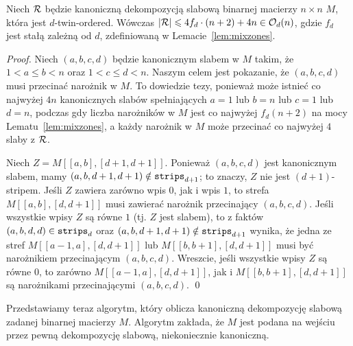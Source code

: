 \documentclass[runningheads]{llncs}
\newcommand{\Oh}{\mathcal{O}}
\renewcommand{\leq}{\leqslant}
\begin{document}
\begin{lemma}\label{lem:canonical-small}
	Niech $\cal R$ będzie kanoniczną dekompozycją slabową binarnej macierzy $n\times n$ $M$, która jest $d$-twin-ordered. Wówczas $|{\cal R}|\leq 4 f_d \cdot (n+2)+4n \in \Oh_d(n)$, gdzie $f_d$ jest 
	stałą zależną od $d$, zdefiniowaną w Lemacie~\ref{lem:mixzones}.
\end{lemma}
\begin{proof}
	Niech $(a,b,c,d)$ będzie kanonicznym slabem w $M$ takim, że $1<a\leq b< n$ oraz $1<c\leq d<n$.
	Naszym celem jest pokazanie, że $(a,b,c,d)$ musi przecinać narożnik w $M$. To dowiedzie tezy, ponieważ może istnieć co najwyżej $4n$ kanonicznych slabów spełniających $a=1$ lub $b=n$ lub $c=1$ lub $d=n$, podczas gdy liczba narożników w $M$ jest co najwyżej $f_d(n+2)$ na mocy Lematu~\ref{lem:mixzones}, a każdy narożnik w $M$ może przecinać co najwyżej $4$ slaby z $\cal R$.
	
	Niech $Z=M[[a,b],[d+1,d+1]]$.
	Ponieważ $(a,b,c,d)$ jest kanonicznym slabem, mamy $(a,b,d+1,d+1)\notin \mathtt{strips}_{d+1}$; to znaczy, $Z$ nie jest $(d+1)$-stripem. Jeśli $Z$ zawiera zarówno wpis $0$, jak i wpis $1$, to strefa $M[[a,b],[d,d+1]]$ musi zawierać narożnik przecinający $(a,b,c,d)$. Jeśli wszystkie wpisy $Z$ są równe $1$ (tj. $Z$ jest slabem), to z faktów $(a,b,d,d)\in \mathtt{strips}_d$ oraz $(a,b,d+1,d+1)\notin \mathtt{strips}_{d+1}$ wynika, że jedna ze stref $M[[a-1,a],[d,d+1]]$ lub $M[[b,b+1],[d,d+1]]$ musi być narożnikiem przecinającym $(a,b,c,d)$. Wreszcie, jeśli wszystkie wpisy $Z$ są równe $0$, to zarówno $M[[a-1,a],[d,d+1]]$, jak i $M[[b,b+1],[d,d+1]]$ są narożnikami przecinającymi $(a,b,c,d)$.
\qed
\end{proof}
















Przedstawiamy teraz algorytm, który oblicza kanoniczną dekompozycję slabową zadanej binarnej macierzy $M$. Algorytm zakłada, że $M$ jest podana na wejściu przez pewną dekompozycję slabową, niekoniecznie kanoniczną.
\end{document}
